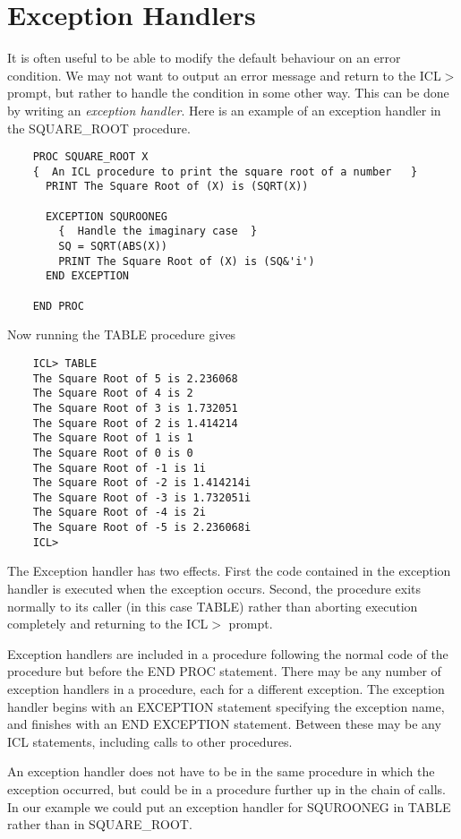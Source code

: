 \documentclass[twoside,11pt]{report}
\newcommand{\xlabel}[1]{}
\begin{document}
\section{\xlabel{exception_handlers}Exception Handlers}

It is often useful to be able to modify the default behaviour on an
error condition. We may not want to output an error message and return
to the ICL$>$ prompt, but rather to handle the condition in some other way.
This can be done by writing an {\em exception handler}. Here is an
example of an exception handler in the SQUARE\_ROOT procedure.

\begin{verbatim}
    PROC SQUARE_ROOT X
    {  An ICL procedure to print the square root of a number   }
      PRINT The Square Root of (X) is (SQRT(X))

      EXCEPTION SQUROONEG
        {  Handle the imaginary case  }
        SQ = SQRT(ABS(X))
        PRINT The Square Root of (X) is (SQ&'i')
      END EXCEPTION

    END PROC
\end{verbatim}

Now running the TABLE procedure gives

\begin{verbatim}
    ICL> TABLE
    The Square Root of 5 is 2.236068
    The Square Root of 4 is 2
    The Square Root of 3 is 1.732051
    The Square Root of 2 is 1.414214
    The Square Root of 1 is 1
    The Square Root of 0 is 0
    The Square Root of -1 is 1i
    The Square Root of -2 is 1.414214i
    The Square Root of -3 is 1.732051i
    The Square Root of -4 is 2i
    The Square Root of -5 is 2.236068i
    ICL>
\end{verbatim}
The Exception handler has two effects. First the code contained in the
exception handler is executed when the exception occurs. Second, the procedure
exits normally to its caller (in this case TABLE) rather than aborting
execution completely and returning to the ICL$>$ prompt.

Exception handlers are included in a procedure following the normal code
of the procedure but before the END PROC statement. There may be any number
of exception handlers in a procedure, each for a different exception.
The exception handler begins with an EXCEPTION statement specifying the
exception name, and finishes with an END EXCEPTION statement. Between
these may be any ICL statements, including calls to other procedures.

An exception handler does not have to be in the same procedure in which the
exception occurred, but could be in a procedure further up in the chain of
calls. In our example we could put an exception handler for SQUROONEG in
TABLE rather than in SQUARE\_ROOT.
\end{document}
